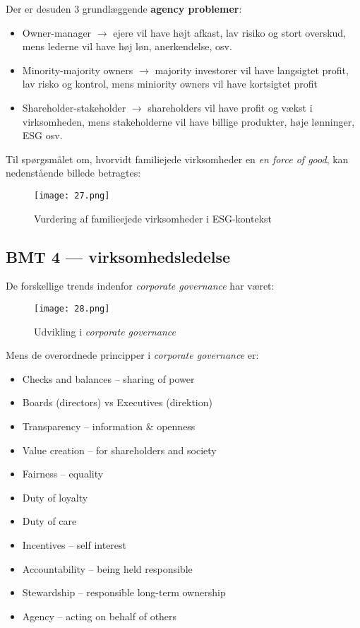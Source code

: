 \documentclass[10pt,reqno, usenames]{article}
\begin{document}
Der er desuden 3 grundlæggende \textbf{agency problemer}: 
\begin{itemize}
    \item Owner-manager $\rightarrow$ ejere vil have højt afkast, lav risiko og stort overskud, mens lederne vil have høj løn, anerkendelse, osv. 
    \item Minority-majority owners $\rightarrow$ majority investorer vil have langsigtet profit, lav risko og kontrol, mens miniority owners vil have kortsigtet profit
    \item Shareholder-stakeholder $\rightarrow$ shareholders vil have profit og vækst i virksomheden, mens stakeholderne vil have billige produkter, høje lønninger, ESG osv.
\end{itemize}

Til spørgsmålet om, hvorvidt familiejede virksomheder en \textit{en force of good}, kan nedenstående billede betragtes: 

\begin{figure}[h]
     \centering
     \texttt{[image: 27.png]}
     \caption{Vurdering af familieejede virksomheder i ESG-kontekst}
     \label{Figur 2}
\end{figure} 

\subsection{BMT 4 — virksomhedsledelse}
De forskellige trends indenfor \textit{corporate governance} har været: 

\begin{figure}[h]
     \centering
     \texttt{[image: 28.png]}
     \caption{Udvikling i \textit{corporate governance}}
     \label{Figur 2}
\end{figure} 

Mens de overordnede principper i \textit{corporate governance} er: 

\begin{itemize}
    \item Checks and balances – sharing of power
    \item Boards (directors) vs Executives (direktion)
    \item Transparency – information \& openness
    \item Value creation – for shareholders and society
    \item Fairness – equality
    \item Duty of loyalty
    \item Duty of care
    \item Incentives – self interest
    \item Accountability – being held responsible
    \item Stewardship – responsible long-term ownership
    \item Agency – acting on behalf of others
\end{itemize}
\end{document}
